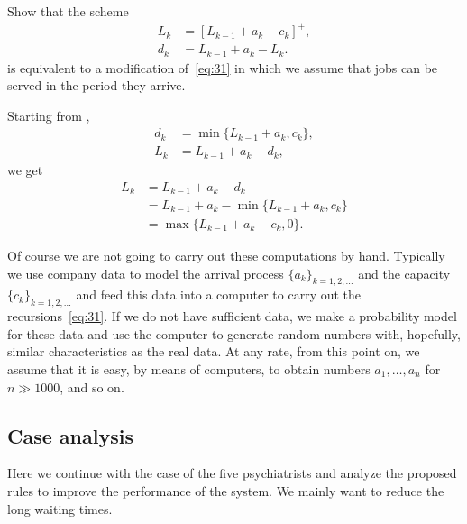 \begin{exercise}
 Show that the scheme
\begin{equation}\label{eq:5}
 \begin{split}
 L_k &= [L_{k-1}+a_k - c_k]^+,\\
 d_k &= L_{k-1} +a_k- L_{k}.
 \end{split}
\end{equation}
is equivalent to a modification of~\cref{eq:31} in which we assume that jobs can be served in the period they arrive.
\begin{solution}
Starting from ,
 \begin{align*}
 d_k &= \min\{L_{k-1}+a_k, c_k\}, \\
 L_k &= L_{k-1} + a_k - d_k,
 \end{align*}
 we get
 \begin{align*}
 L_k &= L_{k-1} + a_k - d_k \\ 
 &= L_{k-1} + a_k - \min\{L_{k-1}+a_k, c_k\} \\
 &= \max\{L_{k-1} + a_k - c_k, 0 \}.
 \end{align*}
\end{solution}
\end{exercise}



Of course we are not going to carry out these computations by hand.
Typically we use company data to model the arrival process $\{a_k\}_{k=1,2,\ldots}$ and the capacity $\{c_k\}_{k=1,2,\ldots}$ and feed this data into a computer to carry out the recursions~\cref{eq:31}.
If we do not have sufficient data, we make a probability model for these data and use the computer to generate random numbers with, hopefully, similar characteristics as the real data.
At any rate, from this point on, we assume that it is easy, by means of computers, to obtain numbers $a_1,\ldots, a_n$ for $n\gg 1000$, and so on.


\subsection*{Case analysis}
\label{sec:case-analysis}

Here we continue with the case of the five psychiatrists and analyze the proposed rules to improve the performance of the system.
We mainly want to reduce the long waiting times.

